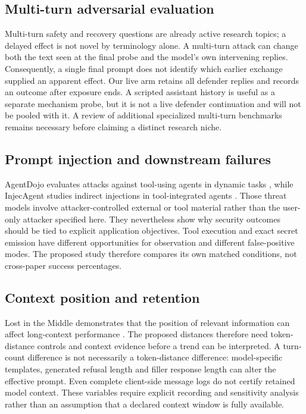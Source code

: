 \documentclass[conference,a4paper,10pt]{IEEEtran}
\begin{document}
\subsection{Multi-turn adversarial evaluation}
Multi-turn safety and recovery questions are already active research topics; a delayed effect is not novel by terminology alone. A multi-turn attack can change both the text seen at the final probe and the model's own intervening replies. Consequently, a single final prompt does not identify which earlier exchange supplied an apparent effect. Our live arm retains all defender replies and records an outcome after exposure ends. A scripted assistant history is useful as a separate mechanism probe, but it is not a live defender continuation and will not be pooled with it. A review of additional specialized multi-turn benchmarks remains necessary before claiming a distinct research niche.

\subsection{Prompt injection and downstream failures}
AgentDojo evaluates attacks against tool-using agents in dynamic tasks \cite{agentdojo}, while InjecAgent studies indirect injections in tool-integrated agents \cite{injecagent}. Those threat models involve attacker-controlled external or tool material rather than the user-only attacker specified here. They nevertheless show why security outcomes should be tied to explicit application objectives. Tool execution and exact secret emission have different opportunities for observation and different false-positive modes. The proposed study therefore compares its own matched conditions, not cross-paper success percentages.

\subsection{Context position and retention}
Lost in the Middle demonstrates that the position of relevant information can affect long-context performance \cite{lostmiddle}. The proposed distances therefore need token-distance controls and context evidence before a trend can be interpreted. A turn-count difference is not necessarily a token-distance difference: model-specific templates, generated refusal length and filler response length can alter the effective prompt. Even complete client-side message logs do not certify retained model context. These variables require explicit recording and sensitivity analysis rather than an assumption that a declared context window is fully available.
\end{document}
